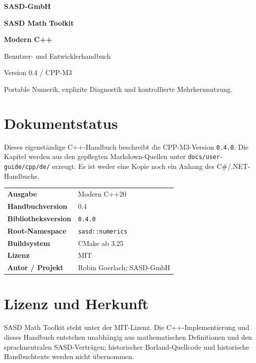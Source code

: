 \documentclass[11pt,a4paper,twoside,openright]{book}
\begin{document}
\frontmatter

\begin{titlepage}
\pagecolor{sasdInk}\color{white}
\vspace*{2cm}
{\sffamily\bfseries\Large SASD-GmbH\par}
\vspace{3cm}
{\bfseries\fontsize{34}{40}\selectfont SASD Math Toolkit\par}
\vspace{0.5cm}
{\color{sasdTeal}\bfseries\fontsize{24}{29}\selectfont Modern C++\par}
\vspace{1cm}
{\Large Benutzer- und Entwicklerhandbuch\par}
{\large Version 0.4 / CPP-M3\par}
\vfill
{\large Portable Numerik, explizite Diagnostik und kontrollierte Mehrkernnutzung.\par}
\vspace{0.8cm}
{\repo\par}
\end{titlepage}
\nopagecolor\color{sasdInk}

\chapter*{Dokumentstatus}

Dieses eigenständige C++-Handbuch beschreibt die CPP-M3-Version
\texttt{0.4.0}. Die Kapitel werden aus den gepflegten Markdown-Quellen unter
\texttt{docs/user-guide/cpp/de/} erzeugt. Es ist weder eine Kopie noch ein
Anhang des C\#/.NET-Handbuchs.

\begin{tabularx}{\textwidth}{@{}>{\bfseries}p{}X@{}}
Ausgabe & Modern C++20\\
Handbuchversion & 0.4\\
Bibliotheksversion & \texttt{0.4.0}\\
Root-Namespace & \texttt{sasd::numerics}\\
Buildsystem & CMake ab 3.25\\
Lizenz & MIT\\
Autor / Projekt & Robin Goerlach; SASD-GmbH\\
\end{tabularx}

\tableofcontents
\clearpage
\mainmatter








\backmatter
\chapter*{Lizenz und Herkunft}
SASD Math Toolkit steht unter der MIT-Lizenz. Die C++-Implementierung und dieses
Handbuch entstehen unabhängig aus mathematischen Definitionen und den
sprachneutralen SASD-Verträgen; historischer Borland-Quellcode und historische
Handbuchtexte werden nicht übernommen.
\end{document}
